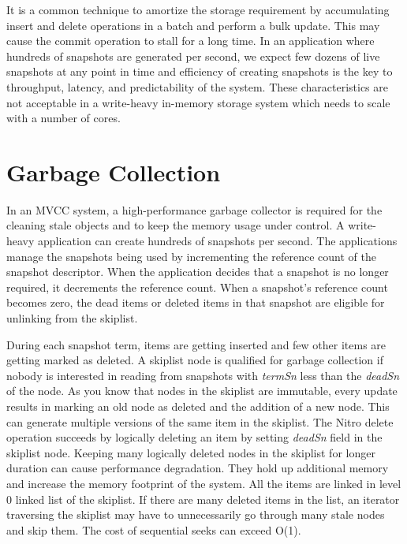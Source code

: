 \documentclass{vldb}
\begin{document}
It is a common technique to amortize the storage requirement by accumulating insert and delete operations in a batch and perform a bulk update. This may cause the commit operation to stall for a long time. In an application where hundreds of snapshots are generated per second, we expect few dozens of live snapshots at any point in time and efficiency of creating snapshots is the key to throughput, latency, and predictability of the system. These characteristics are not acceptable in a write-heavy in-memory storage system which needs to scale with a number of cores.

\section{Garbage Collection}
In an MVCC system, a high-performance garbage collector is required for the cleaning stale objects and to keep the memory usage under control. A write-heavy application can create hundreds of snapshots per second. The applications manage the snapshots being used by incrementing the reference count of the snapshot descriptor. When the application decides that a snapshot is no longer required, it decrements the reference count. When a snapshot's reference count becomes zero, the dead items or deleted items in that snapshot are eligible for unlinking from the skiplist.


During each snapshot term, items are getting inserted and few other items are getting marked as deleted. A skiplist node is qualified for garbage collection if nobody is interested in reading from snapshots with \textit{termSn} less than the \textit{deadSn} of the node. As you know that nodes in the skiplist are immutable, every update results in marking an old node as deleted and the addition of a new node. This can generate multiple versions of the same item in the skiplist. The Nitro delete operation succeeds by logically deleting an item by setting \textit{deadSn} field in the skiplist node. Keeping many logically deleted nodes in the skiplist for longer duration can cause performance degradation. They hold up additional memory and increase the memory footprint of the system. All the items are linked in level 0 linked list of the skiplist. If there are many deleted items in the list, an iterator traversing the skiplist may have to unnecessarily go through many stale nodes and skip them. The cost of sequential seeks can exceed O(1).
\end{document}
